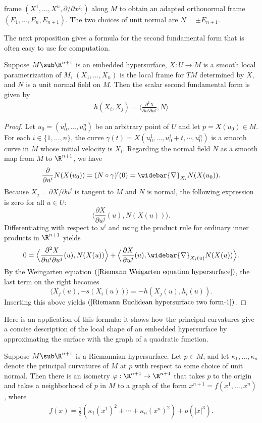 frame $(X^1,\dots,X^n,\partial/\partial x^{j_0})$ along $M$ to obtain an adapted orthonormal frame $(E_1,\dots,E_n,E_{n+1})$. The two choices of unit normal are 
$N=\pm E_{n+1}$.\par
The next proposition gives a formula for the second fundamental form that is often easy to use for computation.
\begin{proposition}\label{Riemann Euclidean hypersurface two form}
Suppose $M\sub\R^{n+1}$ is an embedded hypersurface, $X:U\to M$ is a smooth local parametrization of $M$, $(X_1,\dots,X_n)$ is the local frame for $TM$ determined by $X$, 
and $N$ is a unit normal field on $M$. Then the scalar second fundamental form is given by
\begin{align}\label{Riemann Euclidean hypersurface two form-1}
h(X_i,X_j)=\Big\langle\frac{\partial^2X}{\partial u^i\partial u^j},N\Big\rangle
\end{align}
\end{proposition}
\begin{proof}
Let $u_0=(u_0^1,\dots,u_0^n)$ be an arbitrary point of $U$ and let $p=X(u_0)\in M$. For each $i\in\{1,\dots,n\}$, the curve $\gamma(t)=X(u_0^1,\dots,u_0^i+t,\cdots,u_0^n)$ 
is a smooth curve in $M$ whose initial velocity is $X_i$. Regarding the normal field $N$ as a smooth map from $M$ to $\R^{n+1}$, we have
\[\frac{\partial}{\partial u^i}N(X(u_0))=(N\circ\gamma)'(0)=\widebar{\nabla}_{X_i}N(X(u_0)).\]
Because $X_j=\partial X/\partial u^j$ is tangent to $M$ and $N$ is normal, the following expression is zero for all $u\in U$:
\[\Big\langle\frac{\partial X}{\partial u^j}(u),N(X(u))\Big\rangle.\]
Differentiating with respect to $u^i$ and using the product rule for ordinary inner products in $\R^{n+1}$ yields
\[0=\Big\langle\frac{\partial^2X}{\partial u^i\partial u^j}(u),N(X(u))\Big\rangle+\Big\langle\frac{\partial X}{\partial u^j}(u),\widebar{\nabla}_{X_i(u)}N(X(u))\Big\rangle.\]
By the Weingarten equation $(\ref{Riemann Weigarten equation hypersurface})$, the last term on the right becomes
\[\langle X_j(u),-s(X_i(u))\rangle=-h(X_j(u),h_i(u)).\]
Inserting this above yields $(\ref{Riemann Euclidean hypersurface two form-1})$.
\end{proof}
Here is an application of this formula: it shows how the principal curvatures give a concise description of the local shape of an embedded hypersurface by approximating 
the surface with the graph of a quadratic function.
\begin{proposition}\label{Riemann hypersurface quadratic graph}
Suppose $M\sub\R^{n+1}$ is a Riemannian hypersurface. Let $p\in M$, and let $\kappa_1,\dots,\kappa_n$ denote the principal curvatures of $M$ at $p$ with respect to some 
choice of unit normal. Then there is an isometry $\varphi:\R^{n+1}\to\R^{n+1}$ that takes $p$ to the origin and takes a neighborhood of $p$ in $M$ to a graph of the form 
$x^{n+1}=f(x^1,\dots,x^n)$, where
\begin{align}\label{Riemann hypersurface quadratic graph-1}
f(x)=\frac{1}{2}(\kappa_1(x^1)^2+\cdots+\kappa_n(x^n)^2)+o(|x|^3).
\end{align}
\end{proposition}
